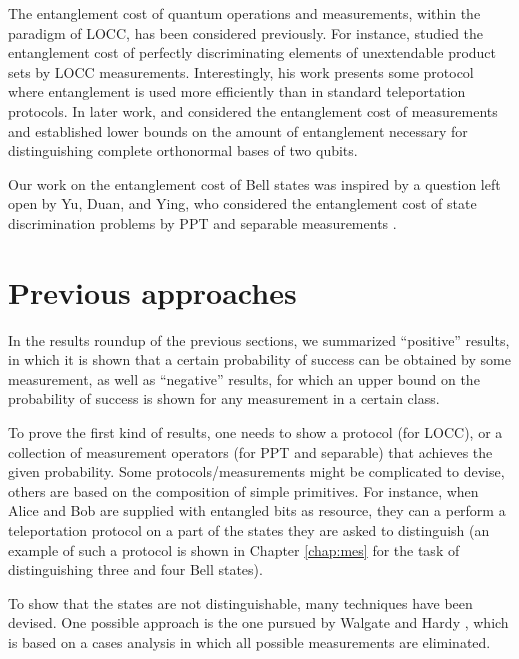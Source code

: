 The entanglement cost of quantum operations and measurements, within the
paradigm of LOCC, has been considered previously.
For instance, \cite{Cohen08} studied the entanglement cost of perfectly
discriminating elements of unextendable product sets by LOCC measurements.
Interestingly, his work presents some protocol where entanglement is used more 
efficiently than in standard teleportation protocols.
In later work, \cite{Bandyopadhyay09} and \cite{Bandyopadhyay10} considered the
entanglement cost of measurements and established lower bounds on the amount of
entanglement necessary for distinguishing complete orthonormal bases of two
qubits.

Our work on the entanglement cost of Bell states was inspired by a question left open by Yu, Duan, and Ying, who considered the entanglement cost of state discrimination problems by PPT and separable measurements \cite{Yu14}.


\section{Previous approaches}

In the results roundup of the previous sections, we summarized ``positive''
results, in which it is shown that a certain probability of success can be obtained by 
some measurement, as well as ``negative'' results, for which an upper bound
on the probability of success is shown for any measurement in a certain class.

To prove the first kind of results, one needs to show a protocol (for LOCC), 
or a collection of measurement operators (for PPT and separable) that achieves 
the given probability.
Some protocols/measurements might be complicated to devise, others are based on 
the composition of simple primitives. For instance, when Alice and Bob are 
supplied with entangled bits as resource, they can a perform a teleportation
protocol on a part of the states they are asked to distinguish 
(an example of such a protocol is shown in Chapter \ref{chap:mes}
for the task of distinguishing three and four Bell states).

To show that the states are not distinguishable, many techniques have been devised.
One possible approach is the one pursued by Walgate and Hardy \cite{Walgate02}, 
which is based on a cases analysis in which all possible measurements are eliminated. 

